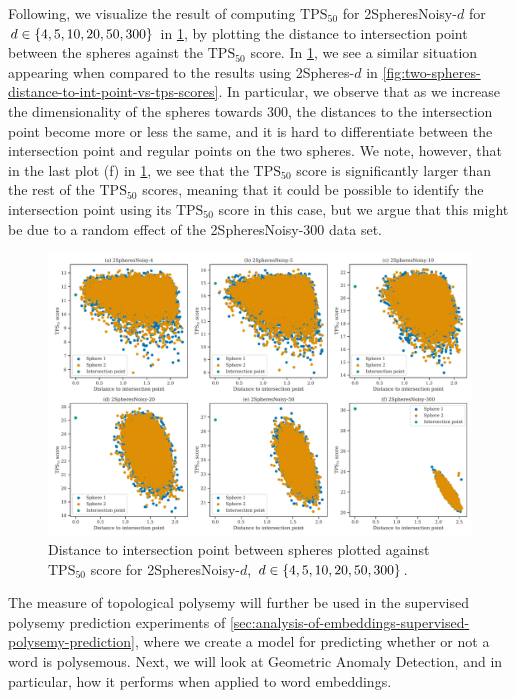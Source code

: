 Following, we visualize the result of computing $\text{TPS}_{50}$ for 2SpheresNoisy-$d$ for $d \in \left\{4, 5, 10, 20, 50, 300\right\}$ in \cref{fig:two-spheres-noisy-distance-to-int-point-vs-tps-scores}, by plotting the distance to intersection point between the spheres against the $\text{TPS}_{50}$ score. In \cref{fig:two-spheres-noisy-distance-to-int-point-vs-tps-scores}, we see a similar situation appearing when compared to the results using 2Spheres-$d$ in \cref{fig:two-spheres-distance-to-int-point-vs-tps-scores}. In particular, we observe that as we increase the dimensionality of the spheres towards 300, the distances to the intersection point become more or less the same, and it is hard to differentiate between the intersection point and regular points on the two spheres. We note, however, that in the last plot (f) in \cref{fig:two-spheres-noisy-distance-to-int-point-vs-tps-scores}, we see that the $\text{TPS}_{50}$ score is significantly larger than the rest of the $\text{TPS}_{50}$ scores, meaning that it could be possible to identify the intersection point using its $\text{TPS}_{50}$ score in this case, but we argue that this might be due to a random effect of the 2SpheresNoisy-300 data set.
\begin{figure}[H]
    \centering
    \includegraphics[width=\textwidth]{thesis/figures/two-spheres-noisy-distance-to-int-point-vs-tps-scores.pdf}
    \caption{Distance to intersection point between spheres plotted against $\text{TPS}_{50}$ score for 2SpheresNoisy-$d$, $d \in \left\{4, 5, 10, 20, 50, 300\right\}$.}
    \label{fig:two-spheres-noisy-distance-to-int-point-vs-tps-scores}
\end{figure}

The measure of topological polysemy will further be used in the supervised polysemy prediction experiments of \cref{sec:analysis-of-embeddings-supervised-polysemy-prediction}, where we create a model for predicting whether or not a word is polysemous. Next, we will look at Geometric Anomaly Detection, and in particular, how it performs when applied to word embeddings.

